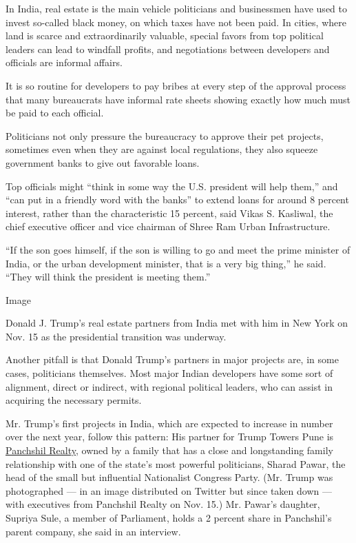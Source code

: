 In India, real estate is the main vehicle politicians and businessmen
have used to invest so-called black money, on which taxes have not been
paid. In cities, where land is scarce and extraordinarily valuable,
special favors from top political leaders can lead to windfall profits,
and negotiations between developers and officials are informal affairs.

It is so routine for developers to pay bribes at every step of the
approval process that many bureaucrats have informal rate sheets showing
exactly how much must be paid to each official.

Politicians not only pressure the bureaucracy to approve their pet
projects, sometimes even when they are against local regulations, they
also squeeze government banks to give out favorable loans.

Top officials might ``think in some way the U.S. president will help
them,'' and ``can put in a friendly word with the banks'' to extend
loans for around 8 percent interest, rather than the characteristic 15
percent, said Vikas S. Kasliwal, the chief executive officer and vice
chairman of Shree Ram Urban Infrastructure.

``If the son goes himself, if the son is willing to go and meet the
prime minister of India, or the urban development minister, that is a
very big thing,'' he said. ``They will think the president is meeting
them.''

Image

Donald J. Trump's real estate partners from India met with him in New
York on Nov. 15 as the presidential transition was underway.

Another pitfall is that Donald Trump's partners in major projects are,
in some cases, politicians themselves. Most major Indian developers have
some sort of alignment, direct or indirect, with regional political
leaders, who can assist in acquiring the necessary permits.

Mr. Trump's first projects in India, which are expected to increase in
number over the next year, follow this pattern: His partner for Trump
Towers Pune is \href{http://www.panchshil.com/}{Panchshil Realty,} owned
by a family that has a close and longstanding family relationship with
one of the state's most powerful politicians, Sharad Pawar, the head of
the small but influential Nationalist Congress Party. (Mr. Trump was
photographed --- in an image distributed on Twitter but since taken down
--- with executives from Panchshil Realty on Nov. 15.) Mr. Pawar's
daughter, Supriya Sule, a member of Parliament, holds a 2 percent share
in Panchshil's parent company, she said in an interview.

